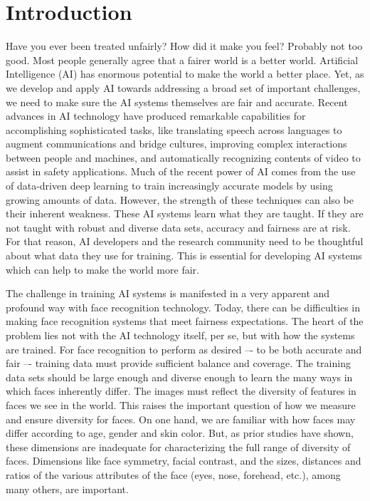 \documentclass[letterpaper,11pt]{article}
\begin{document}
\section{Introduction} \label{sec:intro}

Have you ever been treated unfairly? How did it make you feel? Probably not too good. Most people generally agree that a fairer world is a better world.  Artificial Intelligence (AI) has enormous potential to make the world a better place.  Yet, as we develop and apply AI towards addressing a broad set of important challenges, we need to make sure the AI systems themselves are fair and accurate.  Recent advances in AI technology have produced remarkable capabilities for accomplishing sophisticated tasks, like translating speech across languages to augment communications and bridge cultures, improving complex interactions between people and machines, and automatically recognizing contents of video to assist in safety applications.  Much of the recent power of AI comes from the use of data-driven deep learning to train increasingly accurate models by using growing amounts of data.  However, the strength of these techniques can also be their inherent weakness.  These AI systems learn what they are taught.  If they are not taught with robust and diverse data sets, accuracy and fairness are at risk.  For that reason, AI developers and the research community need to be thoughtful about what data they use for training. This is essential for developing AI systems which can help to make the world more fair.

The challenge in training AI systems is manifested in a very apparent and profound way with face recognition technology. Today, there can be difficulties in making face recognition systems that meet fairness expectations. The heart of the problem lies not with the AI technology itself, per se, but with how the systems are trained.  For face recognition to perform as desired –- to be both accurate and fair –-  training data must provide sufficient balance and coverage.  The training data sets should be large enough and diverse enough to learn the many ways in which faces inherently differ. The images must reflect the diversity of features in faces we see in the world.  This raises the important question of how we measure and ensure diversity for faces.  On one hand, we are familiar with how faces may differ according to age, gender and skin color. But, as prior studies have shown, these dimensions are inadequate for characterizing the full range of diversity of faces. Dimensions like face symmetry, facial contrast, and the sizes, distances and ratios of the various attributes  of the face (eyes, nose, forehead, etc.), among many others, are important. 
 
\end{document}
